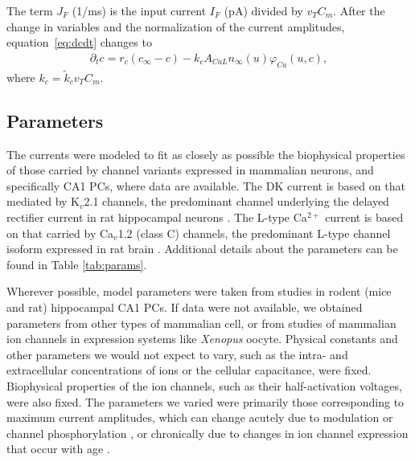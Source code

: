 \documentclass[10pt,letterpaper]{article}
\newcommand{\Ca}{Ca$^{2+}$}
\begin{document}
The term $J_{F}$ (1/ms) is the input current $I_F$ (pA) divided by $v_T C_m$. After the change in variables and the normalization of the current amplitudes,  equation~\eqref{eq:dcdt} changes to 
\begin{eqnarray}
\label{eq:dcdt2}
\partial_t{c} = r_{c}({c_{\infty} - c}) - k_{c} A_{CaL}n_{\infty}(u
) \varphi_{Ca}(u,c),
\end{eqnarray}
where $k_c = \tilde{k}_c v_T C_m$.

\subsection*{Parameters}
The currents were modeled to fit as closely as possible the biophysical properties of those carried by channel variants expressed in mammalian neurons, and specifically CA1 PCs, where data are available. The DK current is based on that mediated by  K$_v$2.1 channels, the predominant channel underlying the delayed rectifier current in rat hippocampal neurons \cite{murakoshi1999identification}. The L-type {\Ca} current is based on that carried by Ca$_v$1.2 (class C) channels, the predominant L-type channel isoform expressed in rat brain \cite{hell1993identification}. Additional details about the parameters can be found in Table \ref{tab:params}.

Wherever possible, model parameters were taken from studies in rodent (mice and rat) hippocampal CA1 PCs. If data were not available, we obtained parameters from other types of mammalian cell, or from studies of mammalian ion channels in expression systems like \textit{Xenopus} oocyte. Physical constants and other parameters we would not expect to vary, such as the intra- and extracellular concentrations of ions or the cellular capacitance, were fixed. Biophysical properties of the ion channels, such as their half-activation voltages, were also fixed. The parameters we varied were primarily those corresponding to maximum current amplitudes, which can change acutely due to modulation or channel phosphorylation \cite{li1992functional,fadool1998modulation}, or chronically due to changes in ion channel expression that occur with age \cite{herman1998up,veng2002regionally}. 
\end{document}
